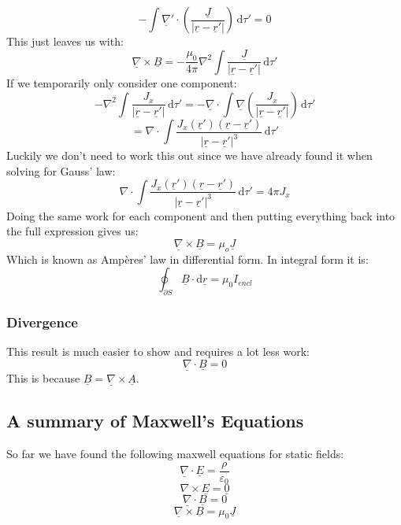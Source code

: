 \documentclass[12pt]{article}
\newcommand{\dive}[1]{\underline{\nabla}\cdot\underline{#1}}
\newcommand{\curl}[1]{\underline{\nabla}\times \underline{#1}}
\begin{document}
\[-\int\underline{\nabla}'\cdot\left(\frac{\underline{J}}{|\underline{r}-\underline{r}'|}\right)\,\text{d}\tau'=0\]
This just leaves us with:
\[\curl{B}=-\frac{\mu_0}{4\pi}\nabla^2\int\frac{\underline{J}}{|\underline{r}-\underline{r}'|}\,\text{d}\tau'\]
If we temporarily only consider one component:
\[-\nabla^2\int\frac{J_x}{|\underline{r}-\underline{r}'|}\,\text{d}\tau'=-\underline{\nabla}\cdot\int\underline{\nabla}\left(\frac{J_x}{|\underline{r}-\underline{r}'|}\right)\,\text{d}\tau'\]
\[=\nabla\cdot\int\frac{J_x(\underline{r}')(\underline{r}-\underline{r}')}{|\underline{r}-\underline{r}'|^3}\,\text{d}\tau'\]
Luckily we don't need to work this out since we have already found it when solving for Gauss' law:
\[\nabla\cdot\int\frac{J_x(\underline{r}')(\underline{r}-\underline{r}')}{|\underline{r}-\underline{r}'|^3}\,\text{d}\tau'=4\pi J_x\]
Doing the same work for each component and then putting everything back into the full expression gives us:
\[\curl{B}=\mu_o\underline{J}\]
Which is known as Amp\`eres' law in differential form. In integral form it is:
\[\oint_{\partial S}\underline{B}\cdot\text{d}\underline{r}=\mu_0I_{encl}\]
\subsubsection{Divergence}
This result is much easier to show and requires a lot less work:
\[\dive{B}=0\]
This is because \(\underline{B}=\curl{A}\).
\subsection{A summary of Maxwell's Equations}
So far we have found the following maxwell equations for static fields:
\[\dive{E}=\frac{\rho}{\varepsilon_0}\]
\[\curl{E}=\underline{0}\]
\[\dive{B}=0\]
\[\curl{B}=\mu_0\underline{J}\]
\end{document}
